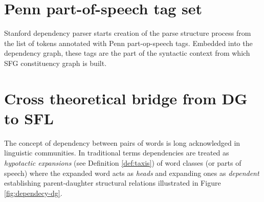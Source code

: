 \section{Penn part-of-speech tag set}

Stanford dependency parser starts creation of the parse structure process from the list of tokens annotated with Penn part-op-speech tags. Embedded into the dependency graph, these tags are the part of the syntactic context from which SFG constituency graph is built. 



\section{Cross theoretical bridge from DG to SFL}
\label{sec:cross-theoretical-bridge}
\label{sec:dependecy-relations-sfl}

The concept of dependency between pairs of words is long acknowledged in linguistic communities. In traditional terms dependencies are treated as \textit{hypotactic expansions} (see Definition \ref{def:taxis}) of word classes (or parts of speech) where the expanded word acts as \textit{heads} and expanding ones as \textit{dependent} establishing parent-daughter structural relations illustrated in Figure \ref{fig:dependecy-dg}.



